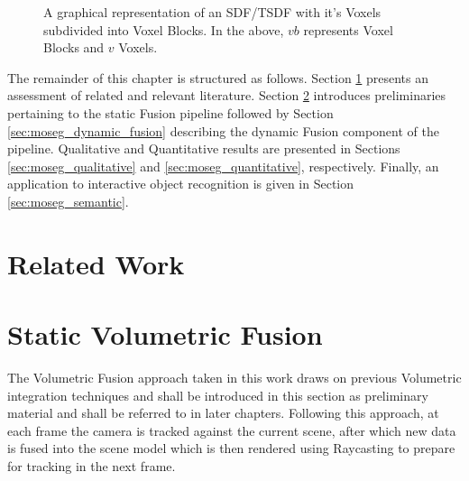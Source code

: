 \begin{figure}[h]
{
  }
  \caption{A graphical representation of an SDF/TSDF with it's Voxels subdivided
  into Voxel Blocks. In the above, $vb$ represents Voxel Blocks and $v$ Voxels.}
\end{figure}

The remainder of this chapter is structured as follows.
Section \ref{sec:moseg_related_work} presents an assessment of related and
relevant literature. Section \ref{sec:moseg_static_fusion} introduces
preliminaries pertaining to the static Fusion pipeline followed by Section
\ref{sec:moseg_dynamic_fusion} describing the dynamic Fusion component of the
pipeline. Qualitative and Quantitative results are presented in Sections
\ref{sec:moseg_qualitative} and \ref{sec:moseg_quantitative}, respectively.
Finally, an application to interactive object recognition is given in Section
\ref{sec:moseg_semantic}.

\section{Related Work}
\label{sec:moseg_related_work}

\section{Static Volumetric Fusion}
\label{sec:moseg_static_fusion}
The Volumetric Fusion approach taken in this work draws on previous Volumetric
integration techniques \cite{Curless1996, Newcombe2011, NieBner2013,
  Prisacariu2014}
and shall be introduced in this section as preliminary material and shall be
referred to in later chapters. Following this approach, at each frame the camera
is tracked against the current scene, after which new data is fused into the
scene model which is then rendered using Raycasting to prepare for tracking in
the next frame.


